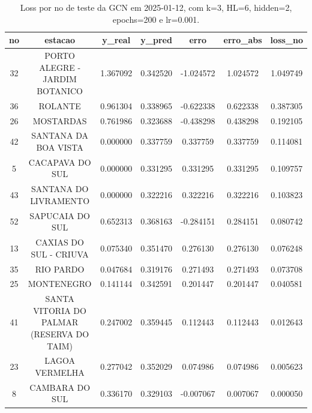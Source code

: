\begin{table}[h]
\centering
\caption{Loss por no de teste da GCN em 2025-01-12, com k=3, HL=6, hidden=2, epochs=200 e lr=0.001.}
\label{tab:gcn_loss_k3_hl6_h2_e200_d20250112}
\begin{tabular}{ccccccc}
\toprule
no & estacao & y\_real & y\_pred & erro & erro\_abs & loss\_no \\
\midrule
32 & PORTO ALEGRE - JARDIM BOTANICO & 1.367092 & 0.342520 & -1.024572 & 1.024572 & 1.049749 \\
36 & ROLANTE & 0.961304 & 0.338965 & -0.622338 & 0.622338 & 0.387305 \\
26 & MOSTARDAS & 0.761986 & 0.323688 & -0.438298 & 0.438298 & 0.192105 \\
42 & SANTANA DA BOA VISTA & 0.000000 & 0.337759 & 0.337759 & 0.337759 & 0.114081 \\
5 & CACAPAVA DO SUL & 0.000000 & 0.331295 & 0.331295 & 0.331295 & 0.109757 \\
43 & SANTANA DO LIVRAMENTO & 0.000000 & 0.322216 & 0.322216 & 0.322216 & 0.103823 \\
52 & SAPUCAIA DO SUL & 0.652313 & 0.368163 & -0.284151 & 0.284151 & 0.080742 \\
13 & CAXIAS DO SUL - CRIUVA & 0.075340 & 0.351470 & 0.276130 & 0.276130 & 0.076248 \\
35 & RIO PARDO & 0.047684 & 0.319176 & 0.271493 & 0.271493 & 0.073708 \\
25 & MONTENEGRO & 0.141144 & 0.342591 & 0.201447 & 0.201447 & 0.040581 \\
41 & SANTA VITORIA DO PALMAR (RESERVA DO TAIM) & 0.247002 & 0.359445 & 0.112443 & 0.112443 & 0.012643 \\
23 & LAGOA VERMELHA & 0.277042 & 0.352029 & 0.074986 & 0.074986 & 0.005623 \\
8 & CAMBARA DO SUL & 0.336170 & 0.329103 & -0.007067 & 0.007067 & 0.000050 \\
\bottomrule
\end{tabular}
\end{table}
